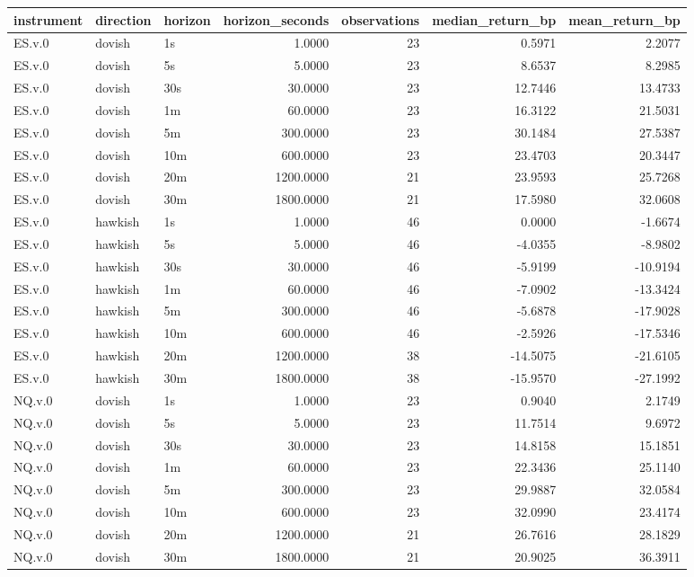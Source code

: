 \begin{tabular}{lllrrrr}
\toprule
instrument & direction & horizon & horizon_seconds & observations & median_return_bp & mean_return_bp \\
\midrule
ES.v.0 & dovish & 1s & 1.0000 & 23 & 0.5971 & 2.2077 \\
ES.v.0 & dovish & 5s & 5.0000 & 23 & 8.6537 & 8.2985 \\
ES.v.0 & dovish & 30s & 30.0000 & 23 & 12.7446 & 13.4733 \\
ES.v.0 & dovish & 1m & 60.0000 & 23 & 16.3122 & 21.5031 \\
ES.v.0 & dovish & 5m & 300.0000 & 23 & 30.1484 & 27.5387 \\
ES.v.0 & dovish & 10m & 600.0000 & 23 & 23.4703 & 20.3447 \\
ES.v.0 & dovish & 20m & 1200.0000 & 21 & 23.9593 & 25.7268 \\
ES.v.0 & dovish & 30m & 1800.0000 & 21 & 17.5980 & 32.0608 \\
ES.v.0 & hawkish & 1s & 1.0000 & 46 & 0.0000 & -1.6674 \\
ES.v.0 & hawkish & 5s & 5.0000 & 46 & -4.0355 & -8.9802 \\
ES.v.0 & hawkish & 30s & 30.0000 & 46 & -5.9199 & -10.9194 \\
ES.v.0 & hawkish & 1m & 60.0000 & 46 & -7.0902 & -13.3424 \\
ES.v.0 & hawkish & 5m & 300.0000 & 46 & -5.6878 & -17.9028 \\
ES.v.0 & hawkish & 10m & 600.0000 & 46 & -2.5926 & -17.5346 \\
ES.v.0 & hawkish & 20m & 1200.0000 & 38 & -14.5075 & -21.6105 \\
ES.v.0 & hawkish & 30m & 1800.0000 & 38 & -15.9570 & -27.1992 \\
NQ.v.0 & dovish & 1s & 1.0000 & 23 & 0.9040 & 2.1749 \\
NQ.v.0 & dovish & 5s & 5.0000 & 23 & 11.7514 & 9.6972 \\
NQ.v.0 & dovish & 30s & 30.0000 & 23 & 14.8158 & 15.1851 \\
NQ.v.0 & dovish & 1m & 60.0000 & 23 & 22.3436 & 25.1140 \\
NQ.v.0 & dovish & 5m & 300.0000 & 23 & 29.9887 & 32.0584 \\
NQ.v.0 & dovish & 10m & 600.0000 & 23 & 32.0990 & 23.4174 \\
NQ.v.0 & dovish & 20m & 1200.0000 & 21 & 26.7616 & 28.1829 \\
NQ.v.0 & dovish & 30m & 1800.0000 & 21 & 20.9025 & 36.3911 \\

\end{tabular}
